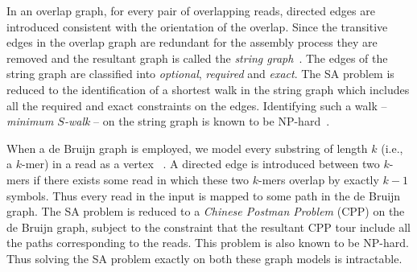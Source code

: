 \documentclass[11pt,conference,twocolumn]{IEEEtran}
\begin{document}
In an overlap graph, for every pair of overlapping reads, directed edges are 
introduced consistent with the orientation of the overlap. Since the transitive edges in the 
overlap graph are redundant for the assembly process they are removed and the resultant graph 
is called the {\em string graph}~\cite{myers95}. The edges
of the string graph are classified into {\em optional}, {\em required} and {\em exact}. The 
SA problem is reduced to the identification of a shortest walk in the string graph which includes all the 
required and exact constraints on the edges. Identifying such a walk -- {\em minimum $S$-walk}
-- on the string graph is known to be \textsf{NP}-hard~\cite{bidirected_graph}. 

When a de Bruijn graph is employed, we model every substring of length $k$ (i.e., a $k$-mer) in a read as a vertex ~\cite{pevzner01}.
A directed edge is introduced between two $k$-mers 
if there exists some read in which these two $k$-mers overlap by exactly $k-1$ symbols. Thus
every read in the input is mapped to some path in the de Bruijn graph. The SA problem
is reduced to a {\em Chinese Postman Problem} (CPP) on the de Bruijn graph, subject to the 
constraint that the resultant CPP tour include all the paths corresponding to the reads.
This problem is also known to be \textsf{NP}-hard. Thus solving the SA problem exactly on 
both these graph models is intractable. 
\end{document}
